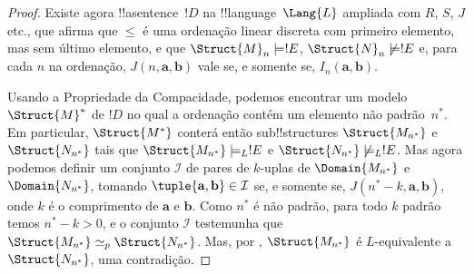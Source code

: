 \documentclass[../../../include/open-logic-section]{subfiles}
\begin{document}
\begin{proof}
Existe agora !!a{sentence}~$!D$ na !!{language}~$\Lang{L}$ ampliada
com $R$, $S$, $J$ etc., que afirma que $\le$ é uma ordenação linear
discreta com primeiro elemento, mas sem último elemento, e que
$\Struct{M}_n \models !E$, $\Struct{N}_n \not\models !E$ e, para cada
$n$ na ordenação, $J(n, \mathbf{a}, \mathbf{b})$ vale se, e somente
se, $I_n(\mathbf{a}, \mathbf{b})$.

Usando a Propriedade da Compacidade, podemos encontrar um modelo
$\Struct{M}^*$ de $!D$ no qual a ordenação contém um elemento não
padrão~$n^*$. Em particular, $\Struct{M^*}$ conterá então
sub!!{structure}s $\Struct{M_{n^*}}$ e $\Struct{N_{n^*}}$ tais que
$\Struct{M_{n^*}} \models_L !E$ e
$\Struct{N_{n^*}} \not\models_L !E$. Mas agora podemos definir um
conjunto $\mathcal{I}$ de pares de $k$-uplas de $\Domain{M_{n^*}}$ e
$\Domain{N_{n^*}}$, tomando
$\tuple{\mathbf{a}, \mathbf{b}} \in \mathcal{I}$ se, e somente se,
$J(n^*-k, \mathbf{a}, \mathbf{b})$, onde $k$ é o comprimento de
$\mathbf{a}$ e $\mathbf{b}$. Como $n^*$ é não padrão, para todo $k$
padrão temos $n^* - k >0$, e o conjunto $\mathcal{I}$ testemunha que
$\Struct{M_{n^*}} \simeq_p \Struct{N_{n^*}}$. Mas, por
, $\Struct{M_{n^*}}$ é $L$-equivalente
a $\Struct{N_{n^*}}$, uma contradição.
\end{proof}
\end{document}

